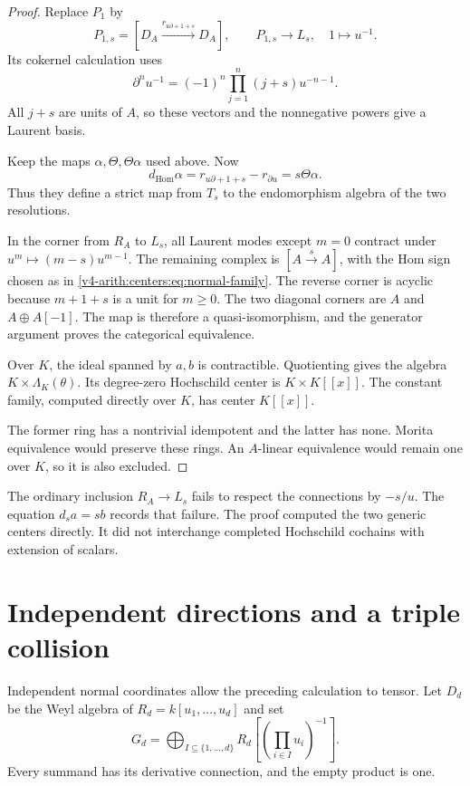 \begin{proof}
Replace $P_1$ by
\[
 P_{1,s}=[D_A\xrightarrow{r_{u\partial+1+s}}D_A],
 \qquad P_{1,s}\longrightarrow L_s,\quad1\longmapsto u^{-1}.
\]
Its cokernel calculation uses
\[
 \partial^n u^{-1}
 =(-1)^n\prod_{j=1}^n(j+s)u^{-n-1}.
\]
All $j+s$ are units of $A$, so these vectors
and the nonnegative powers give a Laurent basis.

Keep the maps $\alpha,\Theta,\Theta\alpha$
used above. Now
\[
 d_{\operatorname{Hom}}\alpha
 =r_{u\partial+1+s}-r_{\partial u}
 =s\Theta\alpha.
\]
Thus they define a strict map from $T_s$ to
the endomorphism algebra of the two resolutions.

In the corner from $R_A$ to $L_s$, all Laurent
modes except $m=0$ contract under
$u^m\mapsto(m-s)u^{m-1}$. The remaining complex
is $[A\xrightarrow{s}A]$, with the Hom sign
chosen as in \eqref{v4-arith:centers:eq:normal-family}.
The reverse corner is acyclic because $m+1+s$
is a unit for $m\geq0$. The two diagonal
corners are $A$ and $A\oplus A[-1]$.
The map is therefore a quasi-isomorphism,
and the generator argument proves the
categorical equivalence.

Over $K$, the ideal spanned by $a,b$ is
contractible. Quotienting gives the algebra
$K\times\Lambda_K(\theta)$. Its degree-zero
Hochschild center is $K\times K[[x]]$.
The constant family, computed directly over
$K$, has center $K[[x]]$.

The former ring has
a nontrivial idempotent and the latter has
none. Morita equivalence would preserve these
rings. An $A$-linear equivalence would remain
one over $K$, so it is also excluded.
\end{proof}

The ordinary inclusion $R_A\to L_s$ fails to
respect the connections by $-s/u$. The equation
$d_sa=sb$ records that failure. The proof
computed the two generic centers directly.
It did not interchange completed Hochschild
cochains with extension of scalars.

\section{Independent directions and a triple collision}
\label{v4-arith:centers:sec:three-points}

Independent normal coordinates allow the preceding
calculation to tensor. Let $D_d$ be the Weyl algebra
of $R_d=k[u_1,\ldots,u_d]$ and set
\[
 G_d=\bigoplus_{I\subseteq\{1,\ldots,d\}}
 R_d\left[\left(\prod_{i\in I}u_i\right)^{-1}\right].
\]
Every summand has its derivative connection, and
the empty product is one.

